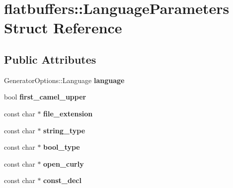 \hypertarget{structflatbuffers_1_1LanguageParameters}{}\section{flatbuffers\+:\+:Language\+Parameters Struct Reference}
\label{structflatbuffers_1_1LanguageParameters}
\subsection*{Public Attributes}
\begin{DoxyCompactItemize}
\item 
\mbox{\label{structflatbuffers_1_1LanguageParameters_a204142c6221e13d47ac5a02a5ee6180f}} 
Generator\+Options\+::\+Language {\bfseries language}
\item 
\mbox{\label{structflatbuffers_1_1LanguageParameters_acb151270c4bf6559b6f588f69a94618c}} 
bool {\bfseries first\+\_\+camel\+\_\+upper}
\item 
\mbox{\label{structflatbuffers_1_1LanguageParameters_a66f15cffbd2525f0e3e878e50daa3294}} 
const char $\ast$ {\bfseries file\+\_\+extension}
\item 
\mbox{\label{structflatbuffers_1_1LanguageParameters_a7d778468c7ee9636d5ffce105b94659e}} 
const char $\ast$ {\bfseries string\+\_\+type}
\item 
\mbox{\label{structflatbuffers_1_1LanguageParameters_a74812ebfcfd48c6804b17bde3c7b831c}} 
const char $\ast$ {\bfseries bool\+\_\+type}
\item 
\mbox{\label{structflatbuffers_1_1LanguageParameters_a0217f01e0af3a546e9709ccd5984cf20}} 
const char $\ast$ {\bfseries open\+\_\+curly}
\item 
\mbox{\label{structflatbuffers_1_1LanguageParameters_a48fa6faf83d8af2c4e2f75a55faa62d7}} 
const char $\ast$ {\bfseries const\+\_\+decl}
\item 

\end{DoxyCompactItemize}
